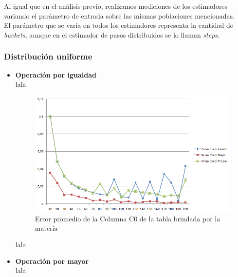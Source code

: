 \quad Al igual que en el an\'alisis previo, realizamos mediciones de los estimadores variando el par\'ametro de entrada sobre las mismas poblaciones mencionadas.\\

\quad El par\'ametro que se var\'ia en todos los estimadores representa la cantidad de \textit{buckets}, aunque en el estimador de pasos distribuidos se lo llaman \textit{steps}.

\subsubsection{Distribuci\'on uniforme}

\begin{itemize}
\item \textbf{Operaci\'on por igualdad} \\

\quad lala\\

\begin{figure}[H]
	  \begin{center}
	    \includegraphics[scale=.80]{imagenes/parametroVariableC0Eq.png}
	    \caption{Error promedio de la Columna C0 de la tabla brindada por la materia} 
	    \label{fig:C2_variando_valor}
	  \end{center}
\end{figure}

\quad lala \\

\item \textbf{Operaci\'on por mayor} \\

\quad lala \\


\end{itemize}
